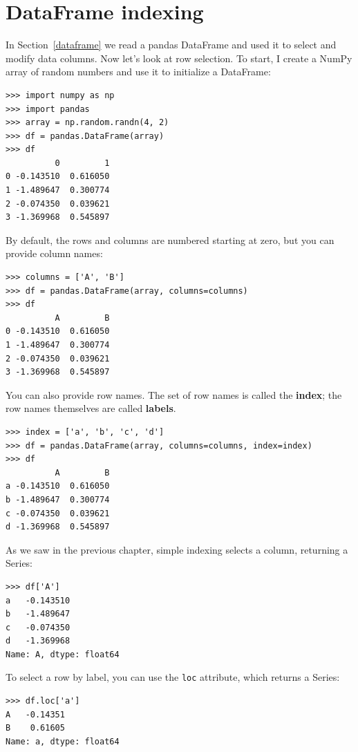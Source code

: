 \documentclass[12pt]{book}
\theoremstyle{exercise}
\begin{document}
\section{DataFrame indexing}

In Section~\ref{dataframe} we read a pandas DataFrame and used it to
select and modify data columns.  Now let's look at row selection.
To start, I create a NumPy array of random numbers and use it
to initialize a DataFrame:%
%
%

\begin{verbatim}
>>> import numpy as np
>>> import pandas
>>> array = np.random.randn(4, 2)
>>> df = pandas.DataFrame(array)
>>> df
          0         1
0 -0.143510  0.616050
1 -1.489647  0.300774
2 -0.074350  0.039621
3 -1.369968  0.545897
\end{verbatim}

By default, the rows and columns are numbered starting at zero, but
you can provide column names:

\begin{verbatim}
>>> columns = ['A', 'B']
>>> df = pandas.DataFrame(array, columns=columns)
>>> df
          A         B
0 -0.143510  0.616050
1 -1.489647  0.300774
2 -0.074350  0.039621
3 -1.369968  0.545897
\end{verbatim}

You can also provide row names.  The set of row names is called the
{\bf index}; the row names themselves are called {\bf labels}.

\begin{verbatim}
>>> index = ['a', 'b', 'c', 'd']
>>> df = pandas.DataFrame(array, columns=columns, index=index)
>>> df
          A         B
a -0.143510  0.616050
b -1.489647  0.300774
c -0.074350  0.039621
d -1.369968  0.545897
\end{verbatim}

As we saw in the previous chapter, simple indexing selects a
column, returning a Series:%

\begin{verbatim}
>>> df['A']
a   -0.143510
b   -1.489647
c   -0.074350
d   -1.369968
Name: A, dtype: float64
\end{verbatim}

To select a row by label, you can use the {\tt loc} attribute, which
returns a Series:

\begin{verbatim}
>>> df.loc['a']
A   -0.14351
B    0.61605
Name: a, dtype: float64
\end{verbatim}
\end{document}
